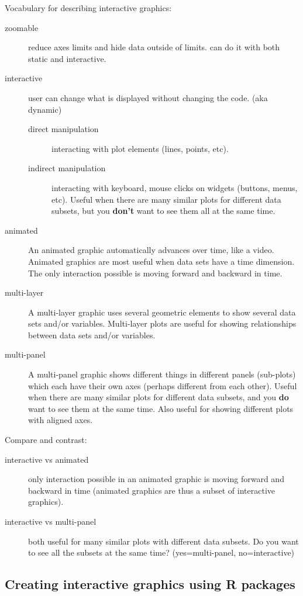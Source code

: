 \documentclass[11pt]{article}
\begin{document}
Vocabulary for describing interactive graphics:
\begin{description}
\item[zoomable] reduce axes limits and hide data outside of limits. can
  do it with both static and interactive.
\item[{interactive}] user can change what is displayed without
  changing the code. (aka dynamic)
  \begin{description}
  \item[{direct manipulation}] interacting with plot elements (lines,
    points, etc).
  \item[{indirect manipulation}] interacting with keyboard, mouse clicks
    on widgets (buttons, menus, etc).
    Useful when there are many similar plots for
different data subsets,
    but you \textbf{don't} want to see them all at the same time.
\end{description}
\item[{animated}] An animated graphic automatically advances over time,
like a video. Animated graphics are most useful when data sets
have a time dimension. The only interaction possible is moving
forward and backward in time.
\item[{multi-layer}] A multi-layer graphic uses several geometric elements
to show several data sets and/or variables. Multi-layer plots are
useful for showing relationships between data sets and/or
variables.
\item[{multi-panel}] A multi-panel graphic shows different things in
different panels (sub-plots) which each have their own axes
(perhaps different from each other). Useful when there are many
similar plots for different data subsets, and you \textbf{do} want to
see them at the same time. Also useful for showing different
plots with aligned axes.
\end{description}
Compare and contrast:
\begin{description}
\item[{interactive vs animated}] only interaction possible in an animated
graphic is moving forward and backward in time (animated graphics
are thus a subset of interactive graphics).
\item[{interactive vs multi-panel}] both useful for many similar plots
with different data subsets. Do you want to see all the subsets
at the same time? (yes=multi-panel, no=interactive)
\end{description}

\subsection{Creating interactive graphics using R packages}
\label{sec:orgheadline9}
\end{document}
